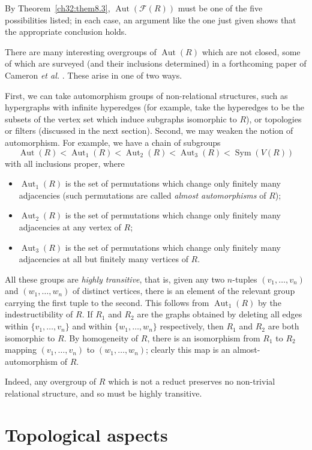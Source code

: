 \documentclass{book}
\DeclareMathOperator{\Sym}{Sym}
\DeclareMathOperator{\Aut}{Aut}
\begin{document}
By Theorem~\ref{ch32:them8.3}, $\Aut(\mathcal{F}(R))$ must be
one of the five possibilities listed; in each case, an argument like
the one just given shows that the appropriate conclusion holds.

\medskip

There are many interesting overgroups of $\Aut(R)$ which are not closed,
some of which are surveyed (and their inclusions determined) in a
forthcoming paper of Cameron \emph{et al.} \cite{ch32:new5}. These
arise in one of two ways.

First, we can take automorphism groups of non-relational structures, such as
hypergraphs with infinite hyperedges (for example, take the hyperedges to
be the subsets of the vertex set which induce subgraphs isomorphic to $R$),
or topologies or filters (discussed in the next section). Second, we may
weaken the notion of automorphism. For example, we have a chain of subgroups
\[
\Aut(R)<\Aut_1(R)<\Aut_2(R)<\Aut_3(R)<\Sym(V(R))
\]
with all inclusions proper, where
\begin{itemize}
\item $\Aut_1(R)$ is the set of permutations which change only finitely many
adjacencies (such permutations are called \emph{almost automorphisms} of $R$);
\item $\Aut_2(R)$ is the set of permutations which change only finitely many
adjacencies at any vertex of $R$;
\item $\Aut_3(R)$ is the set of permutations which change only finitely many
adjacencies at all but finitely many vertices of $R$.
\end{itemize}

All these groups are \emph{highly transitive}, that is, given any two
$n$-tuples $(v_1,\ldots,v_n)$ and $(w_1,\ldots,w_n)$ of distinct vertices,
there is an element of the relevant group carrying the first tuple to the
second. This follows from $\Aut_1(R)$ by the indestructibility of $R$. If
$R_1$ and $R_2$ are the graphs obtained by deleting all edges within
$\{v_1,\ldots,v_n\}$ and within $\{w_1,\ldots,w_n\}$ respectively, then
$R_1$ and $R_2$ are both isomorphic to $R$. By homogeneity of $R$, there
is an isomorphism from $R_1$ to $R_2$ mapping $(v_1,\ldots,v_n)$ to
$(w_1,\ldots,w_n)$; clearly this map is an almost-automorphism of $R$.

Indeed, any overgroup of $R$ which is not a reduct preserves no non-trivial
relational structure, and so must be highly transitive.

\section{Topological aspects}%
\label{ch32:sec2.9}
\end{document}

